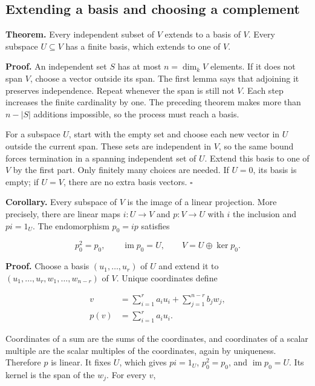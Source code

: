 \documentclass[
  english,
]{article}
\begin{document}
\subsection{Extending a basis and choosing a
complement}\label{extending-a-basis-and-choosing-a-complement}

\textbf{Theorem.} Every independent subset of \(V\) extends to a basis
of \(V\). Every subspace \(U\subseteq V\) has a finite basis, which
extends to one of \(V\).

\textbf{Proof.} An independent set \(S\) has at most \(n=\dim_k V\)
elements. If it does not span \(V\), choose a vector outside its span.
The first lemma says that adjoining it preserves independence. Repeat
whenever the span is still not \(V\). Each step increases the finite
cardinality by one. The preceding theorem makes more than \(n-|S|\)
additions impossible, so the process must reach a basis.

For a subspace \(U\), start with the empty set and choose each new
vector in \(U\) outside the current span. These sets are independent in
\(V\), so the same bound forces termination in a spanning independent
set of \(U\). Extend this basis to one of \(V\) by the first part. Only
finitely many choices are needed. If \(U=0\), its basis is empty; if
\(U=V\), there are no extra basis vectors. \(\square\)

\textbf{Corollary.} Every subspace of \(V\) is the image of a linear
projection. More precisely, there are linear maps \(i:U\to V\) and
\(p:V\to U\) with \(i\) the inclusion and \(pi=1_U\). The endomorphism
\(p_0=ip\) satisfies

\[
p_0^2=p_0,\qquad\operatorname{im}p_0=U,
\qquad V=U\oplus\ker p_0.
\]

\textbf{Proof.} Choose a basis \((u_1,\ldots,u_r)\) of \(U\) and extend
it to \((u_1,\ldots,u_r,w_1,\ldots,w_{n-r})\) of \(V\). Unique
coordinates define

\[
\begin{aligned}
v&=\sum_{i=1}^r a_i u_i+\sum_{j=1}^{n-r}b_jw_j,\\
p(v)&=\sum_{i=1}^r a_i u_i.
\end{aligned}
\]

Coordinates of a sum are the sums of the coordinates, and coordinates of
a scalar multiple are the scalar multiples of the coordinates, again by
uniqueness. Therefore \(p\) is linear. It fixes \(U\), which gives
\(pi=1_U\), \(p_0^2=p_0\), and \(\operatorname{im}p_0=U\). Its kernel is
the span of the \(w_j\). For every \(v\),
\end{document}
